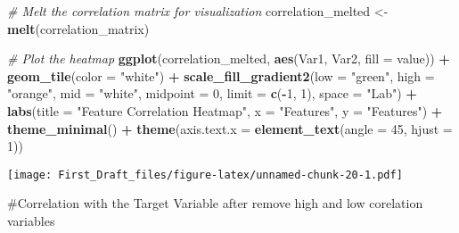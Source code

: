 \documentclass[
]{article}
\newenvironment{Shaded}{\begin{snugshade}}{\end{snugshade}}
\newcommand{\AttributeTok}[1]{\textcolor[rgb]{0.13,0.29,0.53}{#1}}
\newcommand{\CommentTok}[1]{\textcolor[rgb]{0.56,0.35,0.01}{\textit{#1}}}
\newcommand{\ConstantTok}[1]{\textcolor[rgb]{0.56,0.35,0.01}{#1}}
\newcommand{\ControlFlowTok}[1]{\textcolor[rgb]{0.13,0.29,0.53}{\textbf{#1}}}
\newcommand{\DecValTok}[1]{\textcolor[rgb]{0.00,0.00,0.81}{#1}}
\newcommand{\FloatTok}[1]{\textcolor[rgb]{0.00,0.00,0.81}{#1}}
\newcommand{\FunctionTok}[1]{\textcolor[rgb]{0.13,0.29,0.53}{\textbf{#1}}}
\newcommand{\NormalTok}[1]{#1}
\newcommand{\OtherTok}[1]{\textcolor[rgb]{0.56,0.35,0.01}{#1}}
\newcommand{\SpecialCharTok}[1]{\textcolor[rgb]{0.81,0.36,0.00}{\textbf{#1}}}
\newcommand{\StringTok}[1]{\textcolor[rgb]{0.31,0.60,0.02}{#1}}
\begin{document}
\begin{Shaded}
\begin{Highlighting}[]
\CommentTok{\# Melt the correlation matrix for visualization}
\NormalTok{correlation\_melted }\OtherTok{\textless{}{-}} \FunctionTok{melt}\NormalTok{(correlation\_matrix)}

\CommentTok{\# Plot the heatmap}
\FunctionTok{ggplot}\NormalTok{(correlation\_melted, }\FunctionTok{aes}\NormalTok{(Var1, Var2, }\AttributeTok{fill =}\NormalTok{ value)) }\SpecialCharTok{+}
  \FunctionTok{geom\_tile}\NormalTok{(}\AttributeTok{color =} \StringTok{"white"}\NormalTok{) }\SpecialCharTok{+}
  \FunctionTok{scale\_fill\_gradient2}\NormalTok{(}\AttributeTok{low =} \StringTok{"green"}\NormalTok{, }\AttributeTok{high =} \StringTok{"orange"}\NormalTok{, }\AttributeTok{mid =} \StringTok{"white"}\NormalTok{, }\AttributeTok{midpoint =} \DecValTok{0}\NormalTok{, }\AttributeTok{limit =} \FunctionTok{c}\NormalTok{(}\SpecialCharTok{{-}}\DecValTok{1}\NormalTok{, }\DecValTok{1}\NormalTok{), }\AttributeTok{space =} \StringTok{"Lab"}\NormalTok{) }\SpecialCharTok{+}
  \FunctionTok{labs}\NormalTok{(}\AttributeTok{title =} \StringTok{"Feature Correlation Heatmap"}\NormalTok{, }\AttributeTok{x =} \StringTok{"Features"}\NormalTok{, }\AttributeTok{y =} \StringTok{"Features"}\NormalTok{) }\SpecialCharTok{+}
  \FunctionTok{theme\_minimal}\NormalTok{() }\SpecialCharTok{+}
  \FunctionTok{theme}\NormalTok{(}\AttributeTok{axis.text.x =} \FunctionTok{element\_text}\NormalTok{(}\AttributeTok{angle =} \DecValTok{45}\NormalTok{, }\AttributeTok{hjust =} \DecValTok{1}\NormalTok{))}
\end{Highlighting}
\end{Shaded}

\texttt{[image: First\_Draft\_files/figure-latex/unnamed-chunk-20-1.pdf]}

\#Correlation with the Target Variable after remove high and low
corelation variables

\begin{Shaded}
\end{Shaded}
\end{document}
